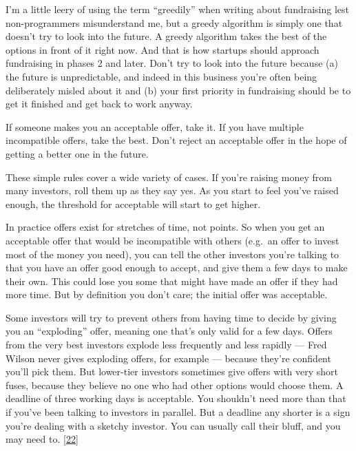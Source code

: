 I'm a little leery of using the term ``greedily'' when writing about
fundraising lest non-programmers misunderstand me, but a greedy
algorithm is simply one that doesn't try to look into the future. A
greedy algorithm takes the best of the options in front of it right now.
And that is how startups should approach fundraising in phases 2 and
later. Don't try to look into the future because (a) the future is
unpredictable, and indeed in this business you're often being
deliberately misled about it and (b) your first priority in fundraising
should be to get it finished and get back to work anyway.

If someone makes you an acceptable offer, take it. If you have multiple
incompatible offers, take the best. Don't reject an acceptable offer in
the hope of getting a better one in the future.

These simple rules cover a wide variety of cases. If you're raising
money from many investors, roll them up as they say yes. As you start to
feel you've raised enough, the threshold for acceptable will start to
get higher.

In practice offers exist for stretches of time, not points. So when you
get an acceptable offer that would be incompatible with others (e.g.~an
offer to invest most of the money you need), you can tell the other
investors you're talking to that you have an offer good enough to
accept, and give them a few days to make their own. This could lose you
some that might have made an offer if they had more time. But by
definition you don't care; the initial offer was acceptable.

Some investors will try to prevent others from having time to decide by
giving you an ``exploding'' offer, meaning one that's only valid for a
few days. Offers from the very best investors explode less frequently
and less rapidly --- Fred Wilson never gives exploding offers, for
example --- because they're confident you'll pick them. But lower-tier
investors sometimes give offers with very short fuses, because they
believe no one who had other options would choose them. A deadline of
three working days is acceptable. You shouldn't need more than that if
you've been talking to investors in parallel. But a deadline any shorter
is a sign you're dealing with a sketchy investor. You can usually call
their bluff, and you may need to. {[}\hyperref[f22n]{22}{]}

